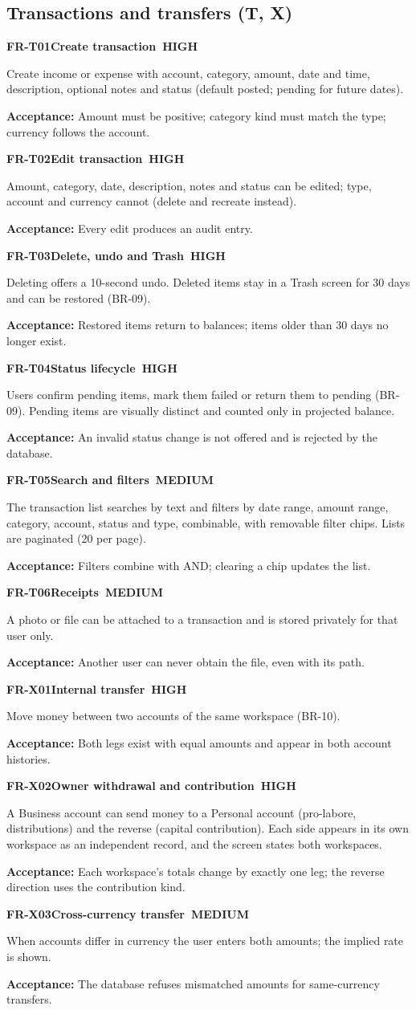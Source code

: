 \documentclass[11pt,a4paper]{article}
\newcommand{\PH}{\colorbox{finlyblue}{\color{white}\scriptsize\bfseries\ HIGH\ }}
\newcommand{\PM}{\colorbox{finlygold}{\color{finlydark}\scriptsize\bfseries\ MEDIUM\ }}
\newcommand{\req}[5]{%
  \begin{tcolorbox}[reqbox]
    {\small\textbf{\textcolor{finlyblue}{#1}}\quad\textbf{#2}\hfill #3}\par\vspace{2pt}
    {\small #4}\par\vspace{2pt}
    {\footnotesize\textcolor{finlytext}{\textbf{Acceptance:} #5}}
  \end{tcolorbox}}
\begin{document}
\subsection{Transactions and transfers (T, X)}
\req{FR-T01}{Create transaction}{\PH}{Create income or expense with account, category, amount, date and time, description, optional notes and status (default posted; pending for future dates).}
{Amount must be positive; category kind must match the type; currency follows the account.}
\req{FR-T02}{Edit transaction}{\PH}{Amount, category, date, description, notes and status can be edited; type, account and currency cannot (delete and recreate instead).}
{Every edit produces an audit entry.}
\req{FR-T03}{Delete, undo and Trash}{\PH}{Deleting offers a 10-second undo. Deleted items stay in a Trash screen for 30 days and can be restored (BR-09).}
{Restored items return to balances; items older than 30 days no longer exist.}
\req{FR-T04}{Status lifecycle}{\PH}{Users confirm pending items, mark them failed or return them to pending (BR-09). Pending items are visually distinct and counted only in projected balance.}
{An invalid status change is not offered and is rejected by the database.}
\req{FR-T05}{Search and filters}{\PM}{The transaction list searches by text and filters by date range, amount range, category, account, status and type, combinable, with removable filter chips. Lists are paginated (20 per page).}
{Filters combine with AND; clearing a chip updates the list.}
\req{FR-T06}{Receipts}{\PM}{A photo or file can be attached to a transaction and is stored privately for that user only.}
{Another user can never obtain the file, even with its path.}
\req{FR-X01}{Internal transfer}{\PH}{Move money between two accounts of the same workspace (BR-10).}
{Both legs exist with equal amounts and appear in both account histories.}
\req{FR-X02}{Owner withdrawal and contribution}{\PH}{A Business account can send money to a Personal account (pro-labore, distributions) and the reverse (capital contribution). Each side appears in its own workspace as an independent record, and the screen states both workspaces.}
{Each workspace's totals change by exactly one leg; the reverse direction uses the contribution kind.}
\req{FR-X03}{Cross-currency transfer}{\PM}{When accounts differ in currency the user enters both amounts; the implied rate is shown.}
{The database refuses mismatched amounts for same-currency transfers.}
\end{document}
